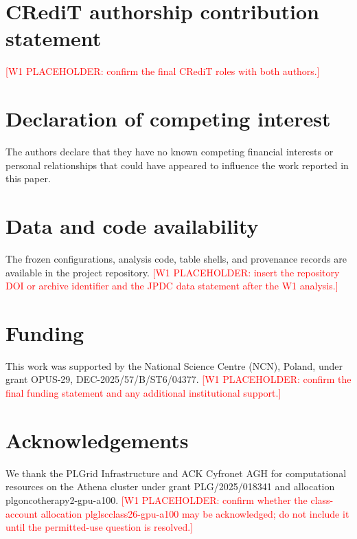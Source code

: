 \documentclass[preprint,12pt]{elsarticle}
\newcommand{\wone}[1]{\textcolor{red}{[W1 PLACEHOLDER: #1]}}
\begin{document}
\section*{CRediT authorship contribution statement}
\wone{confirm the final CRediT roles with both authors.}

\section*{Declaration of competing interest}
The authors declare that they have no known competing financial interests or
personal relationships that could have appeared to influence the work reported
in this paper.

\section*{Data and code availability}
The frozen configurations, analysis code, table shells, and provenance records
are available in the project repository.  \wone{insert the repository DOI or
archive identifier and the JPDC data statement after the W1 analysis.}

\section*{Funding}
This work was supported by the National Science Centre (NCN), Poland, under
grant OPUS-29, DEC-2025/57/B/ST6/04377.  \wone{confirm the final funding
statement and any additional institutional support.}

\section*{Acknowledgements}
We thank the PLGrid Infrastructure and ACK Cyfronet AGH for computational
resources on the Athena cluster under grant PLG/2025/018341 and allocation
plgoncotherapy2-gpu-a100.  \wone{confirm whether the class-account allocation
plglscclass26-gpu-a100 may be acknowledged; do not include it until the
permitted-use question is resolved.}



\end{document}
